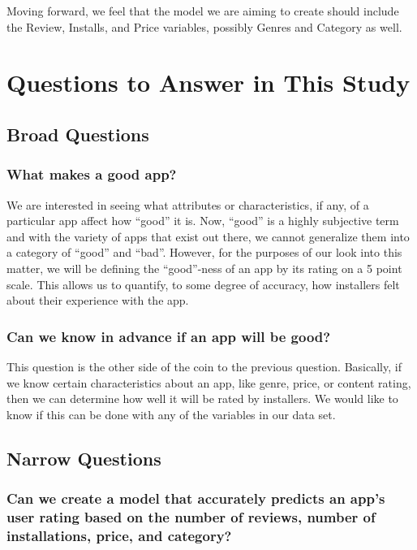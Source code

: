 \documentclass[]{article}
\begin{document}
Moving forward, we feel that the model we are aiming to create should
include the Review, Installs, and Price variables, possibly Genres and
Category as well.

\section{Questions to Answer in This
Study}\label{questions-to-answer-in-this-study}

\subsection{Broad Questions}\label{broad-questions}

\subsubsection{What makes a good app?}\label{what-makes-a-good-app}

We are interested in seeing what attributes or characteristics, if any,
of a particular app affect how ``good'' it is. Now, ``good'' is a highly
subjective term and with the variety of apps that exist out there, we
cannot generalize them into a category of ``good'' and ``bad''. However,
for the purposes of our look into this matter, we will be defining the
``good''-ness of an app by its rating on a 5 point scale. This allows us
to quantify, to some degree of accuracy, how installers felt about their
experience with the app.

\subsubsection{Can we know in advance if an app will be
good?}\label{can-we-know-in-advance-if-an-app-will-be-good}

This question is the other side of the coin to the previous question.
Basically, if we know certain characteristics about an app, like genre,
price, or content rating, then we can determine how well it will be
rated by installers. We would like to know if this can be done with any
of the variables in our data set.

\subsection{Narrow Questions}\label{narrow-questions}

\subsubsection{Can we create a model that accurately predicts an app's
user rating based on the number of reviews, number of installations,
price, and
category?}\label{can-we-create-a-model-that-accurately-predicts-an-apps-user-rating-based-on-the-number-of-reviews-number-of-installations-price-and-category}
\end{document}
